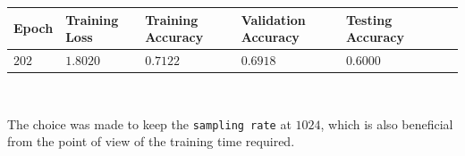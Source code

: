 \documentclass[11pt,a4paper]{article}
\begin{document}
\begin{figure}[H]
\end{figure}
\begin{center}
\hspace*{-0.8cm}
\begin{tabular}{|p{1.2cm}|p{1.8cm}|p{2cm}|p{2cm}|p{2cm}|p{2cm}|p{2cm}|}
\rowcolor{gray!50}
\hline
\textbf{Epoch} & \textbf{Training Loss} & \textbf{Training Accuracy} & \textbf{Validation Accuracy} & \textbf{Testing Accuracy}\\
\hline
$202$ & $1.8020$ & $0.7122$ & $0.6918$ & $0.6000$\\
\hline
\end{tabular}\\
\end{center}
The choice was made to keep the \texttt{sampling rate} at $1024$, which is also beneficial from the point of view of the training time required.
\end{document}
